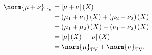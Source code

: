 \documentclass[10pt]{mypackage}
\begin{document}
\begin{enumerate}[(a)]
    \begin{align*}
      \norm{\mu+\nu}_{\text{TV}} &= \left\vert \mu + \nu \right\vert(X)\\
                                                      &= \left( \mu_1 + \nu_1 \right)(X) + \left( \mu_2 + \nu_2 \right)(X)\\
                                          &= \left( \mu_1 + \mu_2 \right)(X) + \left( \nu_1 + \nu_2 \right)(X)\\
                                          &= \left\vert \mu \right\vert(X) + \left\vert \nu \right\vert(X)\\
                                          &= \norm{\mu}_{\text{TV}} + \norm{\nu}_{\text{TV}}.
    \end{align*}
    
\end{enumerate}
\end{document}
